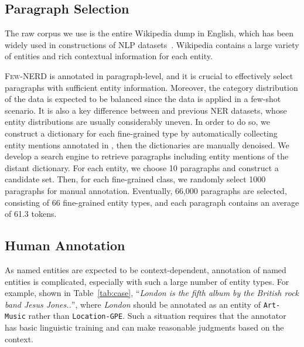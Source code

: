 \documentclass[11pt,a4paper, dvipsnames]{article}
\begin{document}
\subsection{Paragraph Selection}
\label{sec:para}

The raw corpus we use is the entire Wikipedia dump in English, which has been widely used in constructions of NLP datasets~\cite{han2018fewrel,yang2018hotpotqa, wang2020maven}. Wikipedia contains a large variety of entities and rich contextual information for each entity. 


\textsc{Few-NERD} is annotated in paragraph-level, and it is crucial to effectively select paragraphs with sufficient entity information. Moreover, the category distribution of the data is expected to be balanced since the data is applied in a few-shot scenario. It is also a key difference between  and previous NER datasets, whose entity distributions are usually considerably uneven. In order to do so, we construct a dictionary for each fine-grained type by automatically collecting entity mentions annotated in , then the dictionaries are manually denoised.
We develop a search engine to retrieve paragraphs including entity mentions of the distant dictionary. For each entity, we choose 10 paragraphs and construct a candidate set. Then, for each fine-grained class, we randomly select 1000 paragraphs for manual annotation. Eventually, 66,000 paragraphs are selected, consisting of 66 fine-grained entity types, and each paragraph contains an average of 61.3 tokens.



\subsection{Human Annotation}
\label{sec:human}

As named entities are expected to be context-dependent, annotation of named entities is complicated, especially with such a large number of entity types. For example, shown in Table~\ref{tab:case}, ``\textit{London is the fifth album by the British rock band Jesus Jones..}'', where \textit{London} should be annotated as an entity of \texttt{Art-Music} rather than \texttt{Location-GPE}. Such a situation requires that the annotator has basic linguistic training and can make reasonable judgments based on the context.
\end{document}
